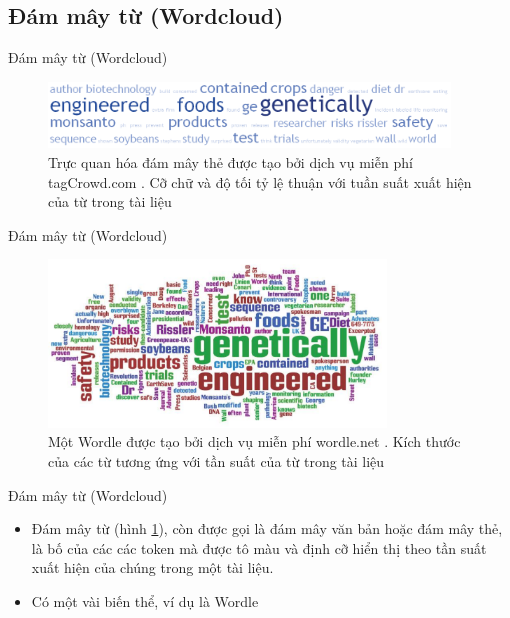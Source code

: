 \documentclass[10pt]{beamer}
\theoremstyle{remark}
\theoremstyle{definition}
\begin{document}
\subsection{Đám mây từ (Wordcloud)}

\begin{frame}{Đám mây từ (Wordcloud)}
	\begin{figure}[h!]
        \centering
        \includegraphics[width=0.95\textwidth]{4.png}
        \caption{Trực quan hóa đám mây thẻ được tạo bởi dịch vụ miễn phí tagCrowd.com \cite{396}.
        Cỡ chữ và độ tối tỷ lệ thuận với tuần suất xuất hiện của từ trong tài liệu}
        \label{fig:4}
    \end{figure}
\end{frame}

\begin{frame}{Đám mây từ (Wordcloud)}
	\begin{figure}[h!]
        \centering
        \includegraphics[width=0.8\textwidth]{5.png}
        \caption{Một Wordle được tạo bởi dịch vụ miễn phí wordle.net \cite{118}.
        Kích thước của các từ tương ứng với tần suất của từ trong tài liệu}
        \label{fig:5}
    \end{figure}
\end{frame}


\begin{frame}{Đám mây từ (Wordcloud)}
	\begin{itemize}
		\item Đám mây từ (hình \ref{fig:4}), còn được gọi là đám mây văn bản hoặc đám mây thẻ, là bố của các các token mà được tô màu và định cỡ hiển thị theo tần suất xuất hiện của chúng trong một tài liệu.
		\item Có một vài biến thể, ví dụ là Wordle
	\end{itemize}
\end{frame}
\end{document}
